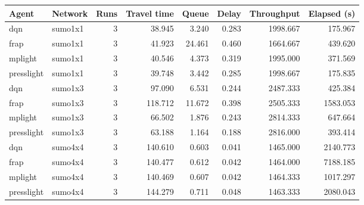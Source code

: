 \begin{tabular}{llrrrrrr}
\toprule
Agent & Network & Runs & Travel time & Queue & Delay & Throughput & Elapsed (s) \\
\midrule
dqn & sumo1x1 & 3 & 38.945 & 3.240 & 0.283 & 1998.667 & 175.967 \\
frap & sumo1x1 & 3 & 41.923 & 24.461 & 0.460 & 1664.667 & 439.620 \\
mplight & sumo1x1 & 3 & 40.546 & 4.373 & 0.319 & 1995.000 & 371.569 \\
presslight & sumo1x1 & 3 & 39.748 & 3.442 & 0.285 & 1998.667 & 175.835 \\
dqn & sumo1x3 & 3 & 97.090 & 6.531 & 0.244 & 2487.333 & 425.384 \\
frap & sumo1x3 & 3 & 118.712 & 11.672 & 0.398 & 2505.333 & 1583.053 \\
mplight & sumo1x3 & 3 & 66.502 & 1.876 & 0.243 & 2814.333 & 647.664 \\
presslight & sumo1x3 & 3 & 63.188 & 1.164 & 0.188 & 2816.000 & 393.414 \\
dqn & sumo4x4 & 3 & 140.610 & 0.603 & 0.041 & 1465.000 & 2140.773 \\
frap & sumo4x4 & 3 & 140.477 & 0.612 & 0.042 & 1464.000 & 7188.185 \\
mplight & sumo4x4 & 3 & 140.469 & 0.607 & 0.042 & 1464.333 & 1017.297 \\
presslight & sumo4x4 & 3 & 144.279 & 0.711 & 0.048 & 1463.333 & 2080.043 \\
\bottomrule
\end{tabular}
